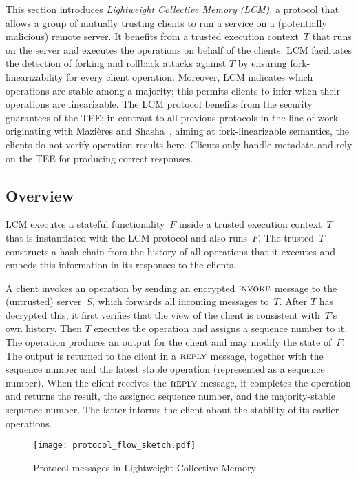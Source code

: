\documentclass[11pt]{article}
\theoremstyle{plain-boldhead}
\theoremstyle{definition-boldhead}
\newcommand{\str}[1]{\textsc{#1}}
\newcommand{\pproj}{Lightweight Collective Memory\xspace}
\newcommand{\pp}{LCM\xspace}
\begin{document}
This section introduces \emph{\pproj} \emph{(\pp)}, a protocol that allows
a group of mutually trusting clients to run a service on a (potentially
malicious) remote server.  It benefits from a trusted execution context~$T$
that runs on the server and executes the operations on behalf of the
clients.
% 
\pp facilitates the detection of forking and rollback attacks against $T$
by ensuring fork-linearizability for every client operation.  Moreover, \pp
indicates which operations are stable among a majority; this permits
clients to infer when their operations are linearizable.
% 
The \pp protocol benefits from the security guarantees of the TEE; in
contrast to all previous protocols in the line of work originating with
Mazi{\`e}res and Shasha~\cite{mazsha02}, aiming at fork-linearizable
semantics, the clients do not verify operation results here.  Clients only
handle metadata and rely on the TEE for producing correct responses.


\subsection{Overview}

\pp executes a stateful functionality~$F$ inside a trusted execution
context~$T$ that is instantiated with the \pp protocol and also runs~$F$.
The trusted~$T$ constructs a hash chain from the history of all operations
that it executes and embeds this information in its responses to the
clients.

A client invokes an operation by sending an encrypted $\str{invoke}$
message to the (untrusted) server~$S$, which forwards all incoming messages
to~$T$.
% 
After $T$ has decrypted this, it first verifies that the view of the client
is consistent with~$T$'s own history.  Then $T$ executes the operation and
assigns a sequence number to it.  The operation produces an output for the
client and may modify the state of~$F$.  The output is returned to the
client in a $\str{reply}$ message, together with the sequence number and
the latest stable operation (represented as a sequence number).
% 
When the client receives the $\str{reply}$ message, it completes the
operation and returns the result, the assigned sequence number, and the
majority-stable sequence number.  The latter informs the client about the
stability of its earlier operations.

\begin{figure}[ht]
    \centering
   \texttt{[image: protocol\_flow\_sketch.pdf]}
    \caption{Protocol messages in \pproj}
    \label{fig:protocl_flow}
\end{figure}
\end{document}
